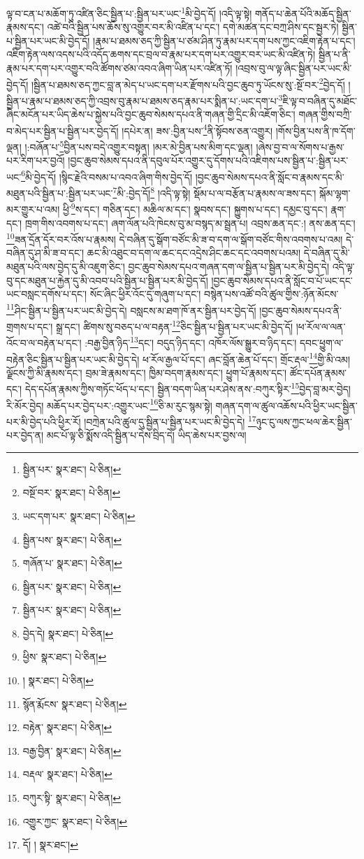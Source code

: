 ལྟ་བ་ངན་པ་མཆོག་ཏུ་འཛིན་ཅིང་སྦྱིན་པ་:སྦྱིན་པར་ཡང་\footnote{སྦྱིན་པར་  སྣར་ཐང་།  པེ་ཅིན། }མི་བྱེད་དོ། །འདི་ལྟ་སྟེ། གནོད་པ་ཆེན་པོའི་མཆོད་སྦྱིན་རྣམས་དང་། འཚེ་བའི་སྦྱིན་པས་ཆོས་སུ་འགྱུར་བར་མི་འཛིན་པ་དང་། དགེ་མཚན་དང་བཀྲ་ཤིས་དང་སྦྱར་ཏེ། སྦྱིན་པ་སྦྱིན་པར་ཡང་མི་བྱེད་དོ། །རྣམ་པ་ཐམས་ཅད་ཀྱི་སྦྱིན་པ་ཙམ་ཤིན་ཏུ་རྣམ་པར་དག་པས་ཀྱང་འཇིག་རྟེན་པ་དང་། འཇིག་རྟེན་ལས་འདས་པའི་འདོད་ཆགས་དང་བྲལ་བ་རྣམ་པར་དག་པར་འགྱུར་བར་ཡང་མི་འཛིན་ཏེ། སྦྱིན་པ་ནི་རྣམ་པར་དག་པར་འགྱུར་བའི་ཚོགས་ཙམ་འབའ་ཞིག་ཡིན་པར་འཛིན་ཏོ། །འབྲས་བུ་ལ་ལྟ་ཞིང་སྦྱིན་པར་ཡང་མི་བྱེད་དོ། །སྦྱིན་པ་ཐམས་ཅད་ཀྱང་བླ་ན་མེད་པ་ཡང་དག་པར་རྫོགས་པའི་བྱང་ཆུབ་ཏུ་ཡོངས་སུ་:སྔོ་བར་\footnote{བསྔོ་བར་  སྣར་ཐང་།  པེ་ཅིན། }བྱེད་དོ། །སྦྱིན་པ་རྣམ་པ་ཐམས་ཅད་ཀྱི་འབྲས་བུ་རྣམ་པ་ཐམས་ཅད་རྣམ་པར་སྨིན་པ་:ཡང་དག་པ་\footnote{ཡང་དག་པར་  སྣར་ཐང་།  པེ་ཅིན། }ཇི་ལྟ་བ་བཞིན་དུ་མཐོང་ཞིང་མངོན་པར་ཡིད་ཆེས་པ་སྐྱེས་པའི་བྱང་ཆུབ་སེམས་དཔའ་ནི་གཞན་གྱི་དྲིང་མི་འཇོག་ཅིང་། གཞན་གྱིས་བཀྲི་བ་མེད་པར་སྦྱིན་པ་སྦྱིན་པར་བྱེད་དོ། །དཔེར་ན། ཟས་:བྱིན་པས་\footnote{སྦྱིན་པས་  སྣར་ཐང་།  པེ་ཅིན། }ནི་སྟོབས་ཅན་འགྱུར། །གོས་བྱིན་པས་ནི་ཁ་དོག་ལྡན། །:བཞོན་པ་\footnote{གཞོན་པ་  སྣར་ཐང་།  པེ་ཅིན། }བྱིན་པས་བདེ་འགྱུར་བསྟན། །མར་མེ་བྱིན་པས་མིག་དང་ལྡན། །ཞེས་བྱ་བ་ལ་སོགས་པ་རྒྱས་པར་རིག་པར་བྱའོ། །བྱང་ཆུབ་སེམས་དཔའ་ནི་དབུལ་པོར་འགྱུར་དུ་དོགས་པའི་འཇིགས་པས་སྦྱིན་པ་:སྦྱིན་པར་ཡང་\footnote{སྦྱིན་པར་  སྣར་ཐང་།  པེ་ཅིན། }མི་བྱེད་དོ། །སྙིང་རྗེའི་བསམ་པ་འབའ་ཞིག་གིས་བྱེད་དོ། །བྱང་ཆུབ་སེམས་དཔའ་ནི་སློང་བ་རྣམས་དང་མི་མཐུན་པའི་སྦྱིན་པ་:སྦྱིན་པར་ཡང་\footnote{སྦྱིན་པར་  སྣར་ཐང་།  པེ་ཅིན། }མི་:བྱེད་དོ།\footnote{བྱེད་དེ།  སྣར་ཐང་།  པེ་ཅིན། } །འདི་ལྟ་སྟེ། སྡོམ་པ་ལ་བརྩོན་པ་རྣམས་ལ་ཟས་དང་། སྐོམ་ལྷག་མར་གྱུར་པ་འམ། ཕྱི་\footnote{ཕྱིས་  སྣར་ཐང་།  པེ་ཅིན། }ས་དང་། གཅིན་དང་། མཆིལ་མ་དང་། སྣབས་དང་། སྐྱུགས་པ་དང་། དམྱང་བུ་དང་། རྣག་དང་། ཁྲག་གིས་འབགས་པ་དང་། ཞག་ལོན་པའི་ཁེངས་བུ་མ་བསྙད་མ་སྦྲན་པ། འབྲས་ཆན་དང་:། ནས་ཆན་དང་། \footnote{།    སྣར་ཐང་།  པེ་ཅིན། }ཟན་དྲོན་དོར་བར་འོས་པ་རྣམས། དེ་བཞིན་དུ་སྒོག་བཙོང་མི་ཟ་བ་དག་ལ་སྒོག་བཙོང་གིས་འབགས་པ་འམ། དེ་བཞིན་དུ་ཤ་མི་ཟ་བ་དང་། ཆང་མི་འཐུང་བ་དག་ལ་ཆང་དང་འདྲེས་ཤིང་ཆང་དང་འབགས་པའམ། དེ་བཞིན་དུ་མི་མཐུན་པའི་ལས་བྱེད་དུ་མི་འཇུག་ཅིང་། བྱང་ཆུབ་སེམས་དཔའ་གཞན་དག་ལ་སྦྱིན་པ་སྦྱིན་པར་མི་བྱེད་དེ། འདི་ལྟ་བུ་དང་མཐུན་པ་རྐྱེན་དུ་མི་འབབ་པའི་སྦྱིན་པ་སྦྱིན་པར་མི་བྱེད་དོ། །བྱང་ཆུབ་སེམས་དཔའ་ནི་སློང་བ་པོ་ཡང་དང་ཡང་བསླང་དགོས་པ་དང་། སོང་ཞིང་ཕྱིར་འོང་དུ་གཞུག་པ་དང་། བསྙེན་པས་འཚོ་བའི་ཚུལ་གྱིས་:ཉོན་མོངས་\footnote{སྙོན་རྨོངས་  སྣར་ཐང་།  པེ་ཅིན། }ཤིང་སྦྱིན་པ་སྦྱིན་པར་ཡང་མི་བྱེད་དེ། བསླངས་མ་ཐག་ཁོ་ནར་སྦྱིན་པར་བྱེད་དོ། །བྱང་ཆུབ་སེམས་དཔའ་ནི་གྲགས་པ་དང་། སྒྲ་དང་། ཚིགས་སུ་བཅད་པ་ལ་བརྟན་\footnote{བརྟེན་  སྣར་ཐང་།  པེ་ཅིན། }ཅིང་སྦྱིན་པ་སྦྱིན་པར་ཡང་མི་བྱེད་དོ། །ཕ་རོལ་ལ་ལན་འོང་བ་ལ་བརྟེན་པ་དང་། :བརྒྱ་བྱིན་ཉིད་\footnote{བརྒྱ་བྱིན་  སྣར་ཐང་།  པེ་ཅིན། }དང་། བདུད་ཉིད་དང་། འཁོར་ལོས་སྒྱུར་བ་ཉིད་དང་། དབང་ཕྱུག་ལ་བརྟེན་ཅིང་སྦྱིན་པ་སྦྱིན་པར་ཡང་མི་བྱེད་དེ། ཕ་རོལ་རྒྱལ་པོ་དང་། ཞང་བློན་ཆེན་པོ་དང་། གྲོང་རྡལ་\footnote{བརྡལ་  སྣར་ཐང་།  པེ་ཅིན། }གྱི་མི་འམ། ལྗོངས་ཀྱི་མི་རྣམས་དང་། བྲམ་ཟེ་རྣམས་དང་། ཁྱིམ་བདག་རྣམས་དང་། ཕྱུག་པོ་རྣམས་དང་། ཚོང་དཔོན་རྣམས་དང་། དེད་དཔོན་རྣམས་ཀྱིས་གཏོང་ཕོད་པ་དང་། སྦྱིན་བདག་ཡིན་པར་ཤེས་ནས་:བཀུར་སྟིར་\footnote{བཀུར་སྟི་  སྣར་ཐང་།  པེ་ཅིན། }བྱེད་བླ་མར་བྱེད། རི་མོར་བྱེད། མཆོད་པར་བྱེད་པར་:འགྱུར་ཡང་\footnote{འགྱུར་ཀྱང་  སྣར་ཐང་།  པེ་ཅིན། }ཅི་མ་རུང་སྙམ་སྟེ། གཞན་དག་ལ་ཚུལ་འཆོས་པའི་ཕྱིར་ཡང་སྦྱིན་པར་མི་བྱེད་པའི་ཕྱིར་རོ། །བཀྲེན་པའི་ཚུལ་དུ་སྦྱིན་པ་སྦྱིན་པར་ཡང་མི་བྱེད་དེ། \footnote{དོ། །   སྣར་ཐང་། }ཉུང་ངུ་ལས་ཀྱང་ཕལ་ཆེར་སྦྱིན་པར་བྱེད་ན། མང་པོ་ལྟ་ཅི་སྨོས་འདི་སྦྱིན་པ་དེས་བྲིད་དེ། ཡིད་ཆེས་པར་བྱས་ལ། 